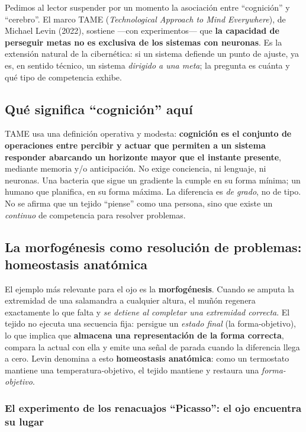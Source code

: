 \documentclass[11pt,a4paper]{article}
\begin{document}
Pedimos al lector suspender por un momento la asociación entre \enquote{cognición} y \enquote{cerebro}. El marco TAME (\emph{Technological Approach to Mind Everywhere}), de Michael Levin (2022), sostiene ---con experimentos--- que \textbf{la capacidad de perseguir metas no es exclusiva de los sistemas con neuronas}. Es la extensión natural de la cibernética: si un sistema defiende un punto de ajuste, ya es, en sentido técnico, un sistema \emph{dirigido a una meta}; la pregunta es cuánta y qué tipo de competencia exhibe.

\subsection{Qué significa \enquote{cognición} aquí}

TAME usa una definición operativa y modesta: \textbf{cognición es el conjunto de operaciones entre percibir y actuar que permiten a un sistema responder abarcando un horizonte mayor que el instante presente}, mediante memoria y/o anticipación. No exige conciencia, ni lenguaje, ni neuronas. Una bacteria que sigue un gradiente la cumple en su forma mínima; un humano que planifica, en su forma máxima. La diferencia es \emph{de grado}, no de tipo. No se afirma que un tejido \enquote{piense} como una persona, sino que existe un \emph{continuo} de competencia para resolver problemas.

\subsection{La morfogénesis como resolución de problemas: homeostasis anatómica}

El ejemplo más relevante para el ojo es la \textbf{morfogénesis}. Cuando se amputa la extremidad de una salamandra a cualquier altura, el muñón regenera exactamente lo que falta y \emph{se detiene al completar una extremidad correcta}. El tejido no ejecuta una secuencia fija: persigue un \emph{estado final} (la forma-objetivo), lo que implica que \textbf{almacena una representación de la forma correcta}, compara la actual con ella y emite una señal de parada cuando la diferencia llega a cero. Levin denomina a esto \textbf{homeostasis anatómica}: como un termostato mantiene una temperatura-objetivo, el tejido mantiene y restaura una \emph{forma-objetivo}.

\subsubsection*{El experimento de los renacuajos \enquote{Picasso}: el ojo encuentra su lugar}
\end{document}
